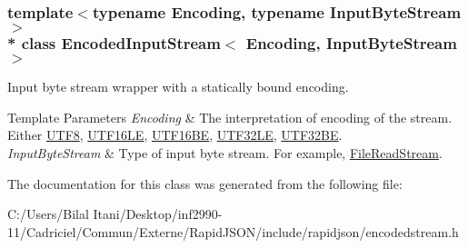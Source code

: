 \subsubsection*{template$<$typename Encoding, typename Input\+Byte\+Stream$>$\\*
class Encoded\+Input\+Stream$<$ Encoding, Input\+Byte\+Stream $>$}

Input byte stream wrapper with a statically bound encoding. 


\begin{DoxyTemplParams}{Template Parameters}
{\em Encoding} & The interpretation of encoding of the stream. Either \hyperlink{struct_u_t_f8}{U\+T\+F8}, \hyperlink{struct_u_t_f16_l_e}{U\+T\+F16\+LE}, \hyperlink{struct_u_t_f16_b_e}{U\+T\+F16\+BE}, \hyperlink{struct_u_t_f32_l_e}{U\+T\+F32\+LE}, \hyperlink{struct_u_t_f32_b_e}{U\+T\+F32\+BE}. \\
\hline
{\em Input\+Byte\+Stream} & Type of input byte stream. For example, \hyperlink{class_file_read_stream}{File\+Read\+Stream}. \\
\hline
\end{DoxyTemplParams}


The documentation for this class was generated from the following file\+:\begin{DoxyCompactItemize}
\item 
C\+:/\+Users/\+Bilal Itani/\+Desktop/inf2990-\/11/\+Cadriciel/\+Commun/\+Externe/\+Rapid\+J\+S\+O\+N/include/rapidjson/encodedstream.\+h\end{DoxyCompactItemize}
